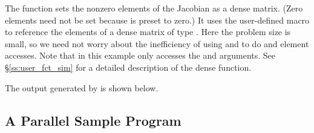 The function  sets the nonzero elements of the Jacobian
as a dense matrix.  (Zero elements need not be set because 
is preset to zero.)  It uses the user-defined macro
to reference the elements of a dense matrix of type .
Here the problem size is small, so we need not worry about the
inefficiency of using  and  to do
 and  element accesses.
Note that in this example  only accesses the  and  arguments.
See \S\ref{ss:user_fct_sim} for a detailed description of the dense  function.

The output generated by  is shown below.
{\small}


\subsection{A Parallel Sample Program}\label{ss:parallel_sim_ex}

